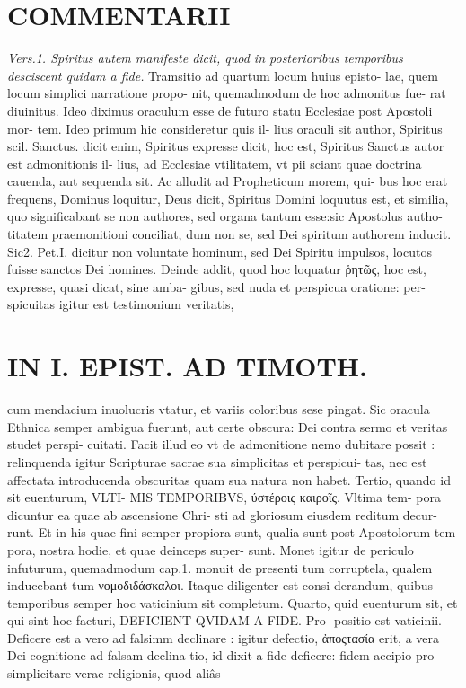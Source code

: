 \documentclass{article}
\begin{document}
\begin{pages}
\section*{COMMENTARII }
\textit{Vers.1. Spiritus autem manifeste dicit, quod in posterioribus temporibus desciscent quidam a fide. }\pstart Tramsitio ad quartum locum huius episto- lae, quem locum simplici narratione propo- nit, quemadmodum de hoc admonitus fue- rat diuinitus. Ideo diximus oraculum esse de futuro statu Ecclesiae post Apostoli mor- tem. Ideo primum hic consideretur quis il- lius oraculi sit author, Spiritus scil. Sanctus. dicit enim, Spiritus expresse dicit, hoc est, Spiritus Sanctus autor est admonitionis il- lius, ad Ecclesiae vtilitatem, vt pii sciant quae doctrina cauenda, aut sequenda sit.  \pend\pstart Ac alludit ad Propheticum morem, qui- bus hoc erat frequens, Dominus loquitur, Deus dicit, Spiritus Domini loquutus est, et similia, quo significabant se non authores, sed organa tantum esse:sic Apostolus autho- titatem praemonitioni conciliat, dum non se, sed Dei spiritum authorem inducit. Sic2. Pet.I. dicitur non voluntate hominum, sed Dei Spiritu impulsos, locutos fuisse sanctos Dei homines.  \pend\pstart Deinde addit, quod hoc loquatur ῥητῶς, hoc est, expresse, quasi dicat, sine amba- gibus, sed nuda et perspicua oratione: per- spicuitas igitur est testimonium veritatis,  \pend
\section*{IN I. EPIST. AD TIMOTH. }
\marginpar{[ p.85 ]}\pstart cum mendacium inuolucris vtatur, et variis coloribus sese pingat. Sic oracula Ethnica semper ambigua fuerunt, aut certe obscura: Dei contra sermo et veritas studet perspi- cuitati. Facit illud eo vt de admonitione nemo dubitare possit : relinquenda igitur Scripturae sacrae sua simplicitas et perspicui- tas, nec est affectata introducenda obscuritas quam sua natura non habet.  \pend\pstart Tertio, quando id sit euenturum, VLTI- MIS TEMPORIBVS, ύστέροις καιροῖς. Vltima tem- pora dicuntur ea quae ab ascensione Chri- sti ad gloriosum eiusdem reditum decur- runt. Et in his quae fini semper propiora sunt, qualia sunt post Apostolorum tem- pora, nostra hodie, et quae deinceps super- sunt. Monet igitur de periculo infuturum, quemadmodum cap.1. monuit de presenti tum corruptela, qualem inducebant tum νομοδιδάσκαλοι. Itaque diligenter est consi derandum, quibus temporibus semper hoc vaticinium sit completum.  \pend\pstart Quarto, quid euenturum sit, et qui sint hoc facturi, DEFICIENT QVIDAM A FIDE. Pro- positio est vaticinii. Deficere est a vero ad falsimm declinare : igitur defectio, ἀποςτασία erit, a vera Dei cognitione ad falsam declina tio, id dixit a fide deficere: fidem accipio pro simplicitare verae religionis, quod aliâs  \pend

\end{pages}
\end{document}
